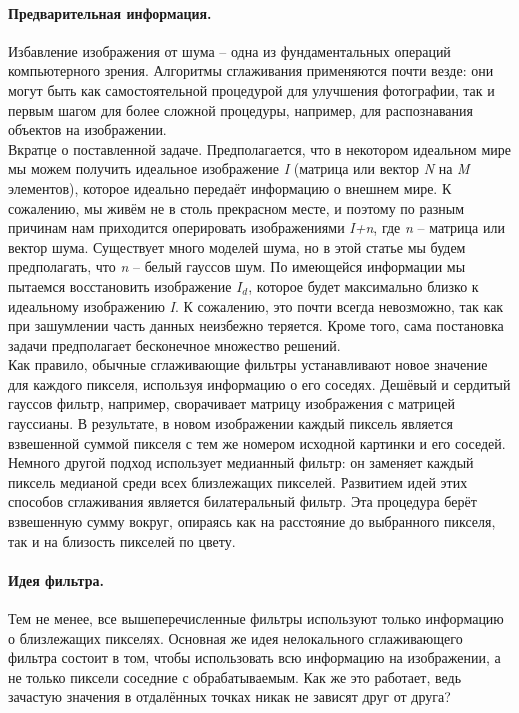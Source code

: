 \documentclass[a4paper,12pt]{article}
\begin{document}
\paragraph{Предварительная информация.} 
Избавление изображения от шума – одна из фундаментальных операций компьютерного зрения. Алгоритмы сглаживания применяются почти везде: они могут быть как самостоятельной процедурой для улучшения фотографии, так и первым шагом для более сложной процедуры, например, для распознавания объектов на изображении. \\
Вкратце о поставленной задаче. Предполагается, что в некотором идеальном мире мы можем получить идеальное изображение \textit{I} (матрица или вектор \textit{N} на \textit{M} элементов), которое идеально передаёт информацию о внешнем мире. К сожалению, мы живём не в столь прекрасном месте, и поэтому по разным причинам нам приходится оперировать изображениями \textit{I+n}, где \textit{n} – матрица или вектор шума. Существует много моделей шума, но в этой статье мы будем предполагать, что \textit{n} – белый гауссов шум. По имеющейся информации мы пытаемся восстановить изображение \textit{$I_d$}, которое будет максимально близко к идеальному изображению \textit{I}. К сожалению, это почти всегда невозможно, так как при зашумлении часть данных неизбежно теряется. Кроме того, сама постановка задачи предполагает бесконечное множество решений. \\
Как правило, обычные сглаживающие фильтры устанавливают новое значение для каждого пикселя, используя информацию о его соседях. Дешёвый и сердитый гауссов фильтр, например, сворачивает матрицу изображения с матрицей гауссианы. В результате, в новом изображении каждый пиксель является взвешенной суммой пикселя с тем же номером исходной картинки и его соседей. Немного другой подход использует медианный фильтр: он заменяет каждый пиксель медианой среди всех близлежащих пикселей. Развитием идей этих способов сглаживания является билатеральный фильтр. Эта процедура берёт взвешенную сумму вокруг, опираясь как на расстояние до выбранного пикселя, так и на близость пикселей по цвету.
\paragraph{Идея фильтра.} 
Тем не менее, все вышеперечисленные фильтры используют только информацию о близлежащих пикселях. Основная же идея нелокального сглаживающего фильтра состоит в том, чтобы использовать всю информацию на изображении, а не только пиксели соседние с обрабатываемым. Как же это работает, ведь зачастую значения в отдалённых точках никак не зависят друг от друга? 
\end{document}
